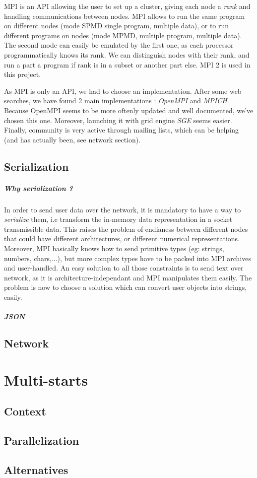 \documentclass{report}
\begin{document}
MPI is an API allowing the user to set up a cluster, giving each node a \textit{rank} and handling communications
between nodes.
MPI allows to run the same program on different nodes (mode SPMD
single program, multiple data), or to run different programs on nodes (mode MPMD, multiple program, multiple data). The
second mode can easily be emulated by the first one, as each processor programmatically knows its rank. We can
distinguish nodes with their rank, and run a part a program if rank is in a subset or another part else. MPI 2 is used
in this project.

As MPI is only an API, we had to choose an implementation. After some web searches, we have found 2 main
implementations : \textit{OpenMPI} and \textit{MPICH}. Because OpenMPI seems to be more oftenly updated and well
documented, we've chosen
this one. Moreover, launching it with grid engine \textit{SGE} seems easier. Finally, community is very active through
mailing lists, which can be helping (and has actually been, see network section).

\section{Serialization}
\paragraph{Why serialization ?}
In order to send user data over the network, it is mandatory to have a way to \textit{serialize} them, i.e transform the
in-memory data representation in a socket transmissible data. This raises the problem of endianess between different
nodes that could have different architectures, or different numerical representations. Moreover, MPI basically knows how
to send primitive types (eg: strings, numbers, chars,...), but more complex types have to be packed into MPI archives
and user-handled. An easy solution to all those constraints is to send text over network, as it is
architecture-independant and MPI manipulates them easily. The problem is now to choose a solution which can convert user
objects into strings, easily.

\paragraph{JSON}

\section{Network}

\chapter{Multi-starts}
\section{Context}

\section{Parallelization}

\section{Alternatives}
\end{document}
